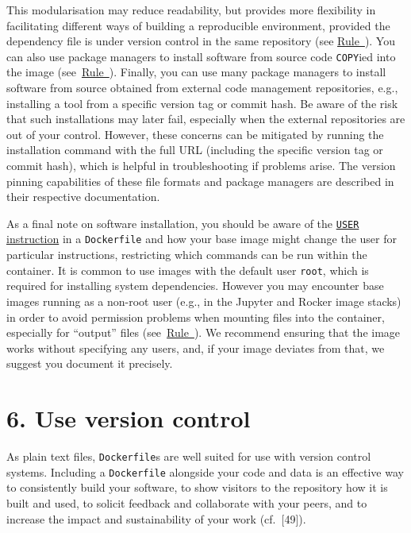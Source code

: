 \documentclass[10pt,letterpaper]{article}
\begin{document}
This modularisation may reduce readability, but provides more
flexibility in facilitating different ways of building a reproducible
environment, provided the dependency file is under version control in
the same repository (see
\hyperref[{rule:publish}]{Rule~}). You can also
use package managers to install software from source code
\texttt{COPY}ied into the image
(see~\hyperref[{rule:mount}]{Rule~}). Finally, you
can use many package managers to install software from source obtained
from external code management repositories, e.g., installing a tool from
a specific version tag or commit hash. Be aware of the risk that such
installations may later fail, especially when the external repositories
are out of your control. However, these concerns can be mitigated by
running the installation command with the full URL (including the
specific version tag or commit hash), which is helpful in
troubleshooting if problems arise. The version pinning capabilities of
these file formats and package managers are described in their
respective documentation.

As a final note on software installation, you should be aware of the
\href{https://docs.docker.com/engine/reference/builder/\#user}{\texttt{USER}
instruction} in a \texttt{Dockerfile} and how your base image might
change the user for particular instructions, restricting which commands
can be run within the container. It is common to use images with the
default user \texttt{root}, which is required for installing system
dependencies. However you may encounter base images running as a
non-root user (e.g., in the Jupyter and Rocker image stacks) in order to
avoid permission problems when mounting files into the container,
especially for ``output'' files
(see~\hyperref[{rule:mount}]{Rule~}). We recommend
ensuring that the image works without specifying any users, and, if your
image deviates from that, we suggest you document it precisely.

\newpage

\hypertarget{use-version-control}{%
\section*{6. Use version control}\label{use-version-control}}

  \label{rule:publish} 

As plain text files, \texttt{Dockerfile}s are well suited for use with
version control systems. Including a \texttt{Dockerfile} alongside your
code and data is an effective way to consistently build your software,
to show visitors to the repository how it is built and used, to solicit
feedback and collaborate with your peers, and to increase the impact and
sustainability of your work (cf.~{[}49{]}).
\end{document}
